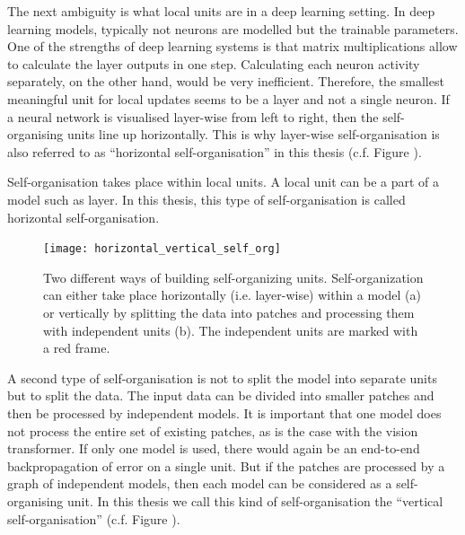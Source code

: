 The next ambiguity is what local units are in a deep learning setting.
In deep learning models, typically not neurons are modelled but the trainable parameters.
One of the strengths of deep learning systems is that matrix multiplications allow to calculate the layer outputs in one step.
Calculating each neuron activity separately, on the other hand, would be very inefficient.
Therefore, the smallest meaningful unit for local updates seems to be a layer and not a single neuron.
If a neural network is visualised layer-wise from left to right, then the self-organising units line up horizontally. This is why layer-wise self-organisation is also referred to as ``horizontal self-organisation'' in this thesis (c.f. Figure ).

\begin{implementation}
	Self-organisation takes place within local units. A local unit can be a part of a model such as layer.
	In this thesis, this type of self-organisation is called horizontal self-organisation.
\end{implementation}

\begin{figure}[h]
    \centering
    \texttt{[image: horizontal\_vertical\_self\_org]}
    \caption[Overview of horizontal and vertical self-organization]{Two different ways of building self-organizing units. Self-organization can either take place horizontally (i.e. layer-wise) within a model (a) or vertically by splitting the data into patches and processing them with independent units (b). The independent units are marked with a red frame.}
\end{figure}
 
A second type of self-organisation is not to split the model into separate units but to split the data.
The input data can be divided into smaller patches and then be processed by independent models.
It is important that one model does not process the entire set of existing patches, as is the case with the vision transformer. If only one model is used, there would again be an end-to-end backpropagation of error on a single unit.
But if the patches are processed by a graph of independent models, then each model can be considered as a self-organising unit.
In this thesis we call this kind of self-organisation the ``vertical self-organisation'' (c.f. Figure ).

